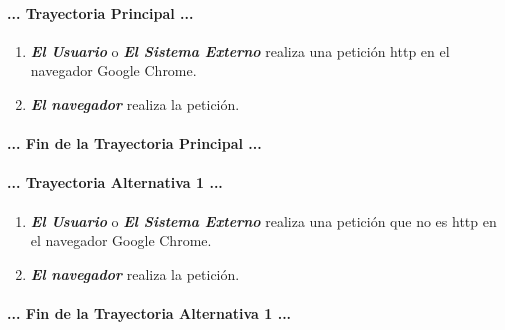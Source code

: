 \documentclass[12pt, a4paper, titlepage]{report}
\begin{document}
				\paragraph{... Trayectoria Principal ...}
				\begin{enumerate}
					\item \textbf{\textit{El Usuario}} o \textbf{\textit{El Sistema Externo}} realiza una petición \acrshort{http} en el navegador Google Chrome.\\
					\item \textbf{\textit{El navegador}} realiza la petición.\\
				\end{enumerate}
				\paragraph{... Fin de la Trayectoria Principal ...}
				
				\paragraph{... Trayectoria Alternativa 1 ...}
				\begin{enumerate}
					\item \textbf{\textit{El Usuario}} o \textbf{\textit{El Sistema Externo}} realiza una petición que no es \acrshort{http} en el navegador Google Chrome.\\
					\item \textbf{\textit{El navegador}} realiza la petición.					
				\end{enumerate}
				\paragraph{... Fin de la Trayectoria Alternativa 1 ...}
				\newpage
				
\end{document}
